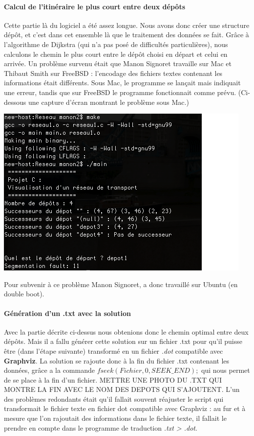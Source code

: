 \documentclass[12pt,a4paper]{report}
\begin{document}
\paragraph{Calcul de l'itinéraire le plus court entre deux dépôts}
Cette partie là du logiciel a été assez longue. Nous avons donc créer une structure dépôt, et c'est dans cet ensemble là que le traitement des données se fait. Grâce à l'algorithme de Dijkstra (qui n'a pas posé de difficultés particulières), nous calculons le chemin le plus court entre le dépôt choisi en départ et celui en arrivée. Un problème survenu était que Manon Signoret travaille sur Mac et Thibaut Smith sur FreeBSD : l'encodage des fichiers textes contenant les informations était différents. Sous Mac, le programme se lançait mais indiquait une erreur, tandis que sur FreeBSD le programme fonctionnait comme prévu. (Ci-dessous une capture d'écran montrant le problème sous Mac.)
\begin{center}
\includegraphics[scale=0.6]{capture1.png}
\end{center}
Pour subvenir à ce problème Manon Signoret, a donc travaillé sur Ubuntu (en double boot).

\paragraph{Génération d'un .txt avec la solution}
Avec la partie décrite ci-dessus nous obtenions donc le chemin optimal entre deux dépôts. Mais il a fallu générer cette solution sur un fichier .txt pour qu'il puisse être (dans l'étape suivante) transformé en un fichier \textit{.dot} compatible avec \textbf{Graphviz}. La solution se rajoute donc à la fin du fichier .txt contenant les données, grâce a la commande \textit{$fseek(Fichier, 0, SEEK\_END);$} qui nous permet de se place à la fin d'un fichier. METTRE UNE PHOTO DU .TXT QUI MONTRE LA FIN AVEC LE NOM DES DEPOTS QUI S'AJOUTENT. L'un des problèmes redondants était qu'il fallait souvent réajuster le script qui transformait le fichier texte en fichier dot compatible avec Graphviz : au fur et à mesure que l'on rajoutait des informations dans le fichier texte, il fallait le prendre en compte dans le programme de traduction \textit{.txt > .dot}.
\end{document}
